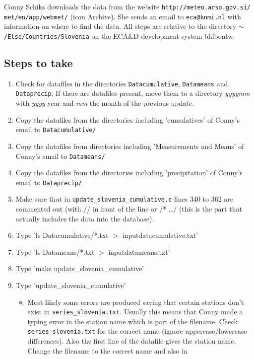 \documentclass[a4paper]{article}
\begin{document}
Conny Schiks downloads the data from the website
\texttt{http://meteo.arso.gov.si/ met/en/app/webmet/} (icon
Archive). She sends an email to \texttt{eca@knmi.nl} with information
on where to find the data. All steps are relative to the directory
\texttt{$\sim$/Else/Countries/Slovenia} on the ECA\&D development
system bhlbontw.

\subsection*{Steps to take}

\begin{enumerate}
\item Check for datafiles in the directories \texttt{Datacumulative},
  \texttt{Datameans} and \texttt{Dataprecip}. If there are datafiles
  present, move them to a directory \textit{yyyymm} with \textit{yyyy}
  year and \textit{mm} the month of the previous update.
\item Copy the datafiles from the directories including 'cumulatives'
  of Conny's email to \texttt{Datacumulative/}
\item Copy the datafiles from directories including 'Measurements and
  Means' of Conny's email to \texttt{Datameans/}
\item Copy the datafiles from the directories including
  'precipitation' of Conny's email to \texttt{Dataprecip/}
\item Make sure that in \texttt{update\_slovenia\_cumulative.c} lines
  340 to 362 are commented out (with // in front of the line or /*
  \dots */ (this is the part that actually includes the data into the
  database).
\item Type 'ls Datacumulative/*.txt $>$ inputdatacumulative.txt'
\item Type 'ls Datameans/*.txt $>$ inputdatameans.txt'
\item Type 'make update\_slovenia\_cumulative'
\item Type 'update\_slovenia\_cumulative'
  \begin{itemize}
  \item Most likely some errors are produced saying that certain
    stations don't exist in \texttt{series\_slovenia.txt}. Usually
    this means that Conny made a typing error in the station name
    which is part of the filename. Check \texttt{series\_slovenia.txt}
    for the correct name (ignore uppercase/lowercase
    differences). Also the first line of the datafile gives the
    station name. Change the filename to the correct name and also in

\end{itemize}
\end{enumerate}
\end{document}
